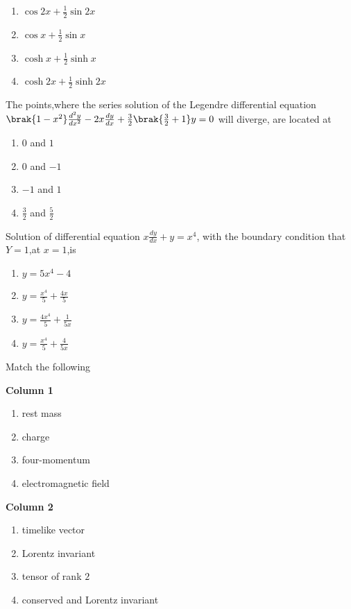     \begin{enumerate}
        \item $\cos{2x}+\frac{1}{2}\sin{2x}$
        \item $\cos{x}+\frac{1}{2}\sin{x}$
        \item $\cosh{x}+\frac{1}{2}\sinh{x}$
        \item $\cosh{2x}+\frac{1}{2}\sinh{2x}$
    \end{enumerate}
    \item The points,where the series solution of the Legendre differential equation $\brak{1-x^2}\frac{d^2 y}{dx^2}-2x\frac{dy}{dx}+\frac{3}{2}\brak{\frac{3}{2}+1}y=0$ will diverge, are located at
    \begin{enumerate}
        \item $0$ and $1$
        \item $0$ and $-1$
        \item $-1$ and $1$
        \item $\frac{3}{2}$ and $\frac{5}{2}$
    \end{enumerate}
    \item Solution of differential equation $x\frac{dy}{dx}+y=x^4$, with the boundary condition that $Y=1$,at $x=1$,is
    \begin{enumerate}
        \item $y=5x^4-4$
        \item $y=\frac{x^4}{5}+\frac{4x}{5}$
        \item $y=\frac{4x^4}{5}+\frac{1}{5x}$
        \item $y=\frac{x^4}{5}+\frac{4}{5x}$
    \end{enumerate}
    \item Match the following\\
\begin{minipage}[t]{0.32\textwidth}
     \textbf{Column 1}\\
     \begin{enumerate}[label=(\Alph*)]
     \item rest mass
     \item charge
     \item four-momentum
     \item electromagnetic field
 \end{enumerate}
     \end{minipage}
     \hfill
\begin{minipage}[t]{0.32\textwidth}
    \textbf{Column 2}\\
    \begin{enumerate}[label=(\alph*), start=16]
    \item timelike vector
    \item Lorentz invariant
    \item tensor of rank $2$
    \item conserved and Lorentz invariant
\end{enumerate}
\end{minipage}
